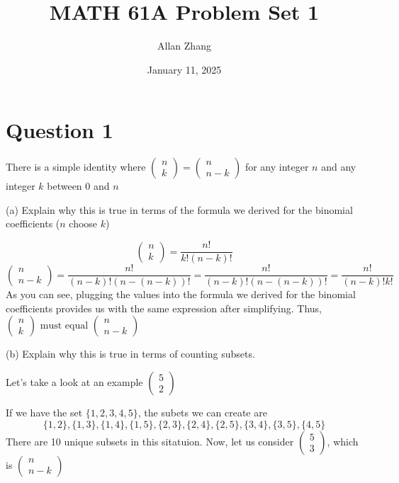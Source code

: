 \documentclass[hidelinks]{article}
\title{\textbf{MATH 61A Problem Set 1}}
\author{Allan Zhang}
\date{January 11, 2025}
\begin{document}
\hypersetup{bookmarksnumbered=true,}
\pagecolor{white}
\color{black}
\maketitle
\section*{Question 1}
There is a simple identity where $\begin{pmatrix}n \\ k \end{pmatrix} = \begin{pmatrix}n \\ n-k \end{pmatrix}$ for any integer $n$ and any integer $k$ between 0 and $n$
\vspace{0.2cm}

(a) Explain why this is true in terms of the formula we derived for the binomial coefficients ($n$ choose $k$)

\[
    \begin{pmatrix}n \\ k \end{pmatrix} = \frac{n!}{k!(n-k)!} 
\]
\[
    \begin{pmatrix}n \\ n-k \end{pmatrix} = \frac{n!}{(n-k)!(n-(n-k))!} =  \frac{n!}{(n-k)!(n-(n-k))!} = \frac{n!}{(n-k)!k!} 
\]
As you can see, plugging the values into the formula we derived for the binomial coefficients provides us with the same expression after simplifying. Thus, $\begin{pmatrix}n \\ k \end{pmatrix} \text{ must equal } \begin{pmatrix}n \\ n-k \end{pmatrix}$
\vspace{0.2cm}

(b) Explain why this is true in terms of counting subsets.

Let's take a look at an example $\begin{pmatrix} 5 \\ 2\end{pmatrix}$ 

If we have the set $\{1, 2, 3, 4, 5\}$, the subets we can create are 
\[
    \{1, 2\}, \{1, 3\}, \{1, 4\}, \{1, 5\}, \{2, 3\}, \{2, 4\}, \{2, 5\}, \{3, 4\}, \{3, 5\}, \{4, 5\}
\]
There are 10 unique subsets in this sitatuion. Now, let us consider $\begin{pmatrix} 5\\ 3 \end{pmatrix}$, which is $\begin{pmatrix} n \\ n-k \end{pmatrix}$
\end{document}
